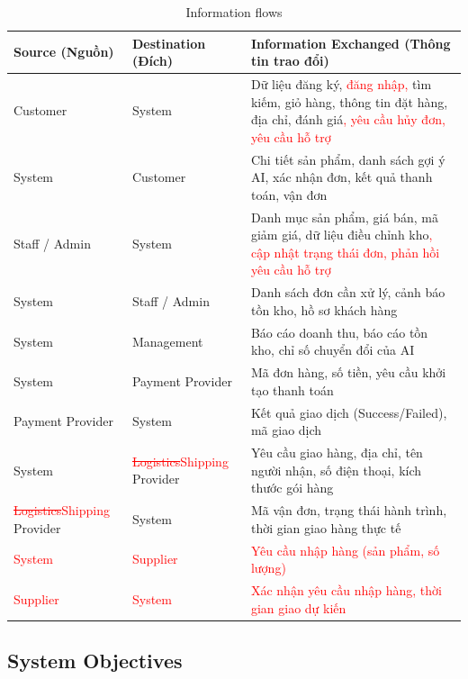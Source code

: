 \documentclass[12pt,a4paper,oneside]{report}
\newif\ifmark \marktrue
\newcommand{\chg}[1]{\ifmark\textcolor{red}{#1}\else #1\fi}
\newcommand{\del}[1]{\ifmark\textcolor{red}{\sout{#1}}\fi}
\begin{document}
\begin{longtable}{p{3.4cm}p{3.4cm}p{9.2cm}}
\caption{Information flows}\\
\toprule
\textbf{Source (Nguồn)} & \textbf{Destination (Đích)} & \textbf{Information Exchanged (Thông tin trao đổi)} \\
\midrule
\endhead
\bottomrule
\endlastfoot
Customer & System & Dữ liệu đăng ký, \chg{đăng nhập, }tìm kiếm, giỏ hàng, thông tin đặt hàng, địa chỉ, đánh giá\chg{, yêu cầu hủy đơn, yêu cầu hỗ trợ} \\
System & Customer & Chi tiết sản phẩm, danh sách gợi ý AI, xác nhận đơn, kết quả thanh toán, vận đơn \\
Staff / Admin & System & Danh mục sản phẩm, giá bán, mã giảm giá, dữ liệu điều chỉnh kho\chg{, cập nhật trạng thái đơn, phản hồi yêu cầu hỗ trợ} \\
System & Staff / Admin & Danh sách đơn cần xử lý, cảnh báo tồn kho, hồ sơ khách hàng \\
System & Management & Báo cáo doanh thu, báo cáo tồn kho, chỉ số chuyển đổi của AI \\
System & Payment Provider & Mã đơn hàng, số tiền, yêu cầu khởi tạo thanh toán \\
Payment Provider & System & Kết quả giao dịch (Success/Failed), mã giao dịch \\
System & \del{Logistics}\chg{Shipping} Provider & Yêu cầu giao hàng, địa chỉ, tên người nhận, số điện thoại, kích thước gói hàng \\
\del{Logistics}\chg{Shipping} Provider & System & Mã vận đơn, trạng thái hành trình, thời gian giao hàng thực tế \\
\chg{System} & \chg{Supplier} & \chg{Yêu cầu nhập hàng (sản phẩm, số lượng)} \\
\chg{Supplier} & \chg{System} & \chg{Xác nhận yêu cầu nhập hàng, thời gian giao dự kiến} \\
\end{longtable}

\subsection{System Objectives}
\end{document}
